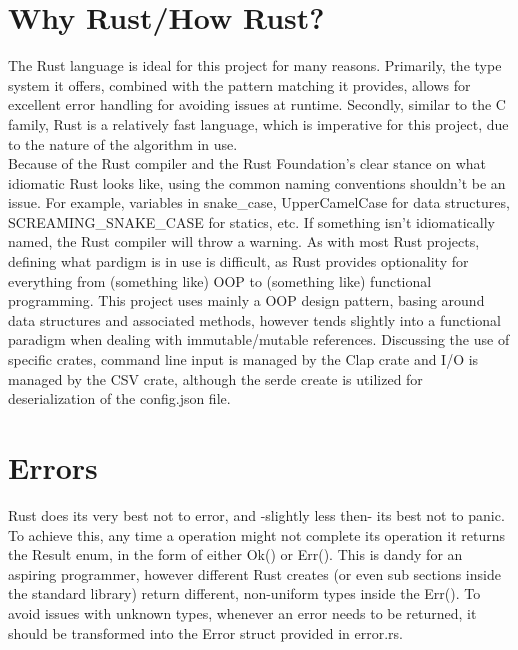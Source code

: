 \documentclass[11pt]{article}
\begin{document}
\section{Why Rust/How Rust?}
The Rust language is ideal for this project for many reasons. Primarily, the type system it offers, combined with the
pattern matching it provides, allows for excellent error handling for avoiding issues at runtime. Secondly, similar to the C family,
Rust is a relatively fast language, which is imperative for this project, due to the nature of the algorithm in use. \\
Because of the Rust compiler and the Rust Foundation's clear stance on what idiomatic Rust looks like, using the common naming conventions shouldn't be an issue.
For example, variables in snake\_case, UpperCamelCase for data structures, SCREAMING\_SNAKE\_CASE for statics, etc. If something isn't idiomatically named, the 
Rust compiler will throw a warning. As with most Rust projects, defining what pardigm is in use is difficult, as Rust provides optionality for everything 
from (something like) OOP to (something like) functional programming. This project uses mainly a OOP design pattern, basing around data 
structures and associated methods, however tends slightly into a functional paradigm when dealing with immutable/mutable references.
Discussing the use of specific crates, command line input is managed by the Clap crate and I/O is managed by the CSV crate, although the serde create is utilized for
deserialization of the config.json file.

\section{Errors}
Rust does its very best not to error, and -slightly less then- its best not to panic. To achieve this, any time a operation might not complete its 
operation it returns the Result enum, in the form of either Ok() or Err(). This is dandy for an aspiring programmer, however different Rust creates (or even sub sections inside
the standard library) return different, non-uniform types inside the Err(). To avoid issues with unknown types, whenever an error needs to be returned, it should be transformed into the Error struct
provided in error.rs. 
\end{document}
